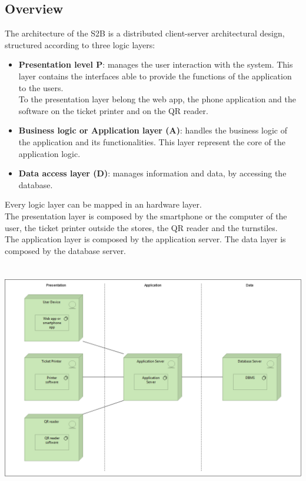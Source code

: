 \subsection{Overview}
The architecture of the S2B is a distributed client-server architectural design, structured according to three logic layers:
\begin{itemize}
	\item \textbf{Presentation level P}: manages the user interaction with the system. This layer contains the interfaces able to provide the functions of the application to the users.\\
	To the presentation layer belong the web app, the phone application and the software on the ticket printer and on the QR reader.
	\item \textbf{Business logic or Application layer (A)}: handles the business logic of the application and its functionalities. This layer represent the core of the application logic.
	\item \textbf{Data access layer (D)}: manages information and data, by accessing the database.  
\end{itemize}
Every logic layer can be mapped in an hardware layer.\\
The presentation layer is composed by the smartphone or the computer of the user, the ticket printer outside the stores, the QR reader and the turnstiles.\\
The application layer is composed by the application server.
The data layer is composed by the database server.\\\\\\
\includegraphics[scale=0.4]{Images/Archimate.png}\\
